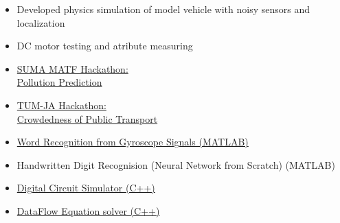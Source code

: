\begin{itemize}
    \item   \small{Developed physics simulation of model vehicle with noisy sensors and localization}
    \item   \small{DC motor testing and atribute measuring} \\
\end{itemize}


    \begin{itemize}
        \item \href{https://github.com/basicskill/matf-hackathon}{SUMA MATF Hackathon: \\Pollution Prediction}
        \item \href{https://github.com/basicskill/tum-hackathon}{TUM-JA Hackathon: \\Crowdedness of Public Transport}

        \item \href{https://esveske.github.io/pdf/2016/PFE1605.pdf}{Word Recognition from Gyroscope Signals (MATLAB)}
        \item Handwritten Digit Recognision (Neural Network from Scratch) (MATLAB)
        \item \href{https://github.com/basicskill/OOP}{Digital Circuit Simulator (C++)}
        \item \href{https://github.com/basicskill/OOP}{DataFlow Equation solver (C++)}
    \end{itemize}

    
